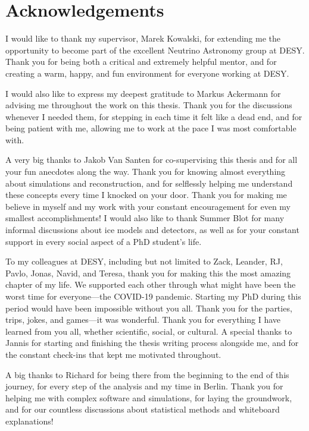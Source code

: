 \chapter*{Acknowledgements}
I would like to thank my supervisor, Marek Kowalski, for extending me the opportunity to become part of the excellent Neutrino Astronomy group at DESY. Thank you for being both a critical and extremely helpful mentor, and for creating a warm, happy, and fun environment for everyone working at DESY.

I would also like to express my deepest gratitude to Markus Ackermann for advising me throughout the work on this thesis. Thank you for the discussions whenever I needed them, for stepping in each time it felt like a dead end, and for being patient with me, allowing me to work at the pace I was most comfortable with.

A very big thanks to Jakob Van Santen for co-supervising this thesis and for all your fun anecdotes along the way. Thank you for knowing almost everything about simulations and reconstruction, and for selflessly helping me understand these concepts every time I knocked on your door. Thank you for making me believe in myself and my work with your constant encouragement for even my smallest accomplishments! I would also like to thank Summer Blot for many informal discussions about ice models and detectors, as well as for your constant support in every social aspect of a PhD student's life.

To my colleagues at DESY, including but not limited to Zack, Leander, RJ, Pavlo, Jonas, Navid, and Teresa, thank you for making this the most amazing chapter of my life. We supported each other through what might have been the worst time for everyone—the COVID-19 pandemic. Starting my PhD during this period would have been impossible without you all. Thank you for the parties, trips, jokes, and games—it was wonderful. Thank you for everything I have learned from you all, whether scientific, social, or cultural. A special thanks to Jannis for starting and finishing the thesis writing process alongside me, and for the constant check-ins that kept me motivated throughout.

A big thanks to Richard for being there from the beginning to the end of this journey, for every step of the analysis and my time in Berlin. Thank you for helping me with complex software and simulations, for laying the groundwork, and for our countless discussions about statistical methods and whiteboard explanations!

